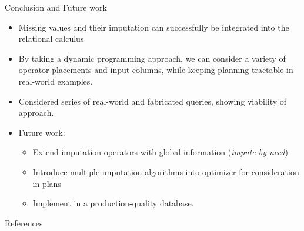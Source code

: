 \documentclass{beamer}
\begin{document}
\begin{frame}[fragile]{Conclusion and Future work}
\begin{itemize}
	\item Missing values and their imputation can successfully be integrated into the relational calculus
	\item By taking a dynamic programming approach, we can consider a variety of operator placements
and input columns, while keeping planning tractable in real-world examples.
	\item Considered series of real-world and fabricated queries, showing viability of approach.
	\item Future work:
		\begin{itemize}
			\item Extend imputation operators with global information (\textit{impute by need})
			\item Introduce multiple imputation algorithms into optimizer for consideration in plans \
			\item Implement in a production-quality database.
		\end{itemize}
\end{itemize}
\end{frame}

\begin{frame}[t,allowframebreaks]{References}
  \nocite{*}
  \printbibliography
 \end{frame}
\end{document}
